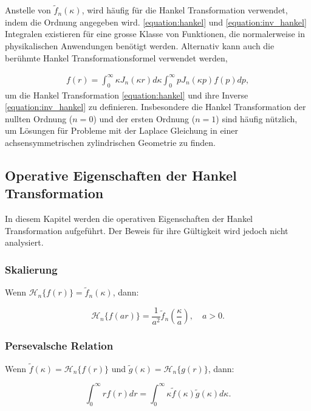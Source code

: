 Anstelle von $\tilde{f}_n(\kappa)$, wird häufig für die Hankel Transformation verwendet, indem die Ordnung angegeben wird.
\eqref{equation:hankel} und \eqref{equation:inv_hankel} Integralen existieren für eine grosse Klasse von Funktionen, die normalerweise in physikalischen Anwendungen benötigt werden.
Alternativ kann auch die berühmte Hankel Transformationsformel verwendet werden, 

\begin{align}
	f(r) = \int_{0}^{\infty}\kappa J_n(\kappa r) d\kappa \int_{0}^{\infty} p J_n(\kappa p)f(p) dp,
	\label{equation:hankel_integral_formula}
\end{align}
um die Hankel Transformation \eqref{equation:hankel} und ihre Inverse \eqref{equation:inv_hankel} zu definieren.
Insbesondere die Hankel Transformation der nullten Ordnung ($n=0$) und der ersten Ordnung ($n=1$) sind häufig nützlich, um Lösungen für Probleme mit der Laplace Gleichung in einer achsensymmetrischen zylindrischen Geometrie zu finden.

\subsection{Operative Eigenschaften der Hankel Transformation\label{sub:op_properties_hankel}}
In diesem Kapitel werden die operativen Eigenschaften der Hankel Transformation aufgeführt. Der Beweis für ihre Gültigkeit wird jedoch nicht analysiert.

\subsubsection{Skalierung \label{subsub:skalierung}}
Wenn $\mathscr{H}_n\{f(r)\}=\tilde{f}_n(\kappa)$, dann:

\begin{equation}
	\mathscr{H}_n\{f(ar)\}=\frac{1}{a^{2}}\tilde{f}_n \left(\frac{\kappa}{a}\right), \quad a>0.
\end{equation}

\subsubsection{Persevalsche Relation \label{subsub:perseval}}
Wenn $\tilde{f}(\kappa)=\mathscr{H}_n\{f(r)\}$ und $\tilde{g}(\kappa)=\mathscr{H}_n\{g(r)\}$, dann:

\begin{equation}
	\int_{0}^{\infty}rf(r) dr = \int_{0}^{\infty}\kappa\tilde{f}(\kappa)\tilde{g}(\kappa) d\kappa.
\end{equation}

